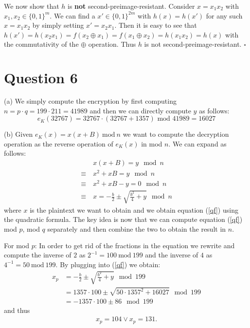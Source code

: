 \documentclass[11pt]{article}
\begin{document}
\medskip

\noindent We now show that $h$ is \textbf{not} second-preimage-resistant. Consider $x=x_1 x_2$ with $x_1,x_2 \in \{0,1\}^m$. We can find a $x' \in \{0,1\}^{2m}$ with $h(x) = h(x')$ for any such $x=x_1 x_2$ by simply setting $x' = x_2 x_1$. Then it is easy to see that $h(x') = h(x_2 x_1) = f(x_2 \oplus x_1) = f(x_1 \oplus x_2) = h(x_1 x_2) = h(x)$ with the commutativity of the $\oplus$ operation. Thus $h$ is not second-preimage-resistant. $\square$

\section*{Question 6}

(a) We simply compute the encryption by first computing $n = p \cdot q = 199 \cdot 211 = 41989$ and then we can directly compute $y$ as follows:
$$
e_K(32767) = 32767 \cdot (32767 + 1357) \text{ mod } 41989 = 16027
$$

\noindent (b) Given $e_K(x) = x(x+B) \ \text{mod} \ n$ we want to compute the decryption operation as the reverse operation of $e_K(x)$ in mod $n$. We can expand as follows:
\begin{align}
    & x(x+B) = y \mod n \nonumber \\
    \equiv \ & x^2+xB = y \mod n \nonumber \\
    \equiv \ & x^2+xB-y = 0 \mod n \nonumber \\
    \equiv \ & x = -\frac{b}{2} \pm \sqrt{\frac{b^2}{4}+y} \mod n \label{qf}
\end{align}
where $x$ is the plaintext we want to obtain and we obtain equation (\ref{qf}) using the quadratic formula. The key idea is now that we can compute equation (\ref{qf}) mod $p$, mod $q$ separately and then combine the two to obtain the result in $n$.

\smallskip

\noindent For mod $p$: In order to get rid of the fractions in the equation we rewrite and compute the inverse of $2$ as $2^{-1} = 100 \ \text{mod} \ 199$ and the inverse of $4$ as $4^{-1} = 50 \ \text{mod} \ 199$. By plugging into (\ref{qf}) we obtain:
\begin{align*}
    x_p &= -\frac{b}{2} \pm \sqrt{\frac{b^2}{4}+y} \mod 199 \\
    &= 1357 \cdot 100 \pm \sqrt{50 \cdot 1357^2 + 16027} \mod 199 \\
    &= -1357 \cdot 100 \pm 86 \mod 199
\end{align*}
and thus
\begin{align} \label{x_p}
    x_p = 104 \vee x_p = 131.
\end{align}
\end{document}

